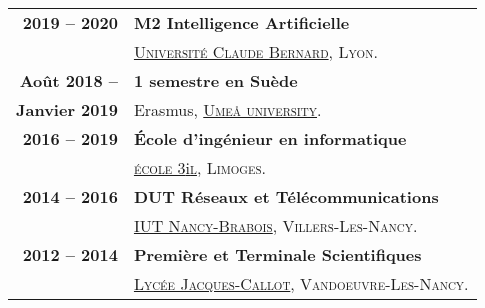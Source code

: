 \begin{supertabular}{rl}
    \textbf{2019 -- 2020} & \textbf{M2 Intelligence Artificielle}\\
    & \href{http://master-info.univ-lyon1.fr/IA/}{\textsc{Universit\'e Claude Bernard}}, \textsc{Lyon}.\\[1.5ex]
    \textbf{Ao\^ut 2018 --} & \textbf{1 semestre en Su\`ede}\\
    \textbf{Janvier 2019} & Erasmus, \href{https://www.umu.se/en}{\textsc{Umeå university}}.\\[1.5ex]
    \textbf{2016 -- 2019} & \textbf{\'Ecole d'ing\'enieur en informatique}\\
    & \href{https://www.3il-ingenieurs.fr/en}{\textsc{\'ecole 3}i\textsc{l}}, \textsc{Limoges}.\\[1.5ex]
    \textbf{2014 -- 2016} & \textbf{DUT R\'eseaux et T\'el\'ecommunications}\\
    & \href{https://iutnb.univ-lorraine.fr/fr/content/rt-dut}{\textsc{IUT Nancy-Brabois}}, \textsc{Villers-Les-Nancy}.\\[1.5ex]
    \textbf{2012 -- 2014} & \textbf{Premi\`ere et Terminale Scientifiques}\\
    & \href{http://www4.ac-nancy-metz.fr/lyc-jacques-callot}{\textsc{Lyc\'ee Jacques-Callot}}, \textsc{Vandoeuvre-Les-Nancy}.\\
\end{supertabular}

\medskip
